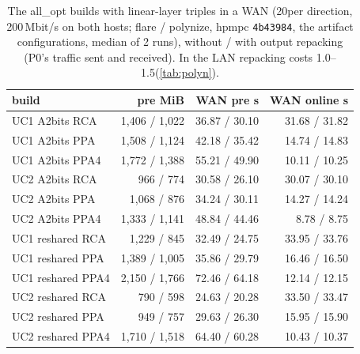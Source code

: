 \begin{table}[t]
\centering\small
\begin{tabular}{@{}lrrr@{}}
\toprule
build & pre MiB & WAN pre s & WAN online s\\
\midrule
UC1 A2bits RCA & 1{,}406 / 1{,}022 & 36.87 / 30.10 & 31.68 / 31.82\\
UC1 A2bits PPA & 1{,}508 / 1{,}124 & 42.18 / 35.42 & 14.74 / 14.83\\
UC1 A2bits PPA4 & 1{,}772 / 1{,}388 & 55.21 / 49.90 & 10.11 / 10.25\\
UC2 A2bits RCA & 966 / 774 & 30.58 / 26.10 & 30.07 / 30.10\\
UC2 A2bits PPA & 1{,}068 / 876 & 34.24 / 30.11 & 14.27 / 14.24\\
UC2 A2bits PPA4 & 1{,}333 / 1{,}141 & 48.84 / 44.46 & 8.78 / 8.75\\
\addlinespace
UC1 reshared RCA & 1{,}229 / 845 & 32.49 / 24.75 & 33.95 / 33.76\\
UC1 reshared PPA & 1{,}389 / 1{,}005 & 35.86 / 29.79 & 16.46 / 16.50\\
UC1 reshared PPA4 & 2{,}150 / 1{,}766 & 72.46 / 64.18 & 12.14 / 12.15\\
UC2 reshared RCA & 790 / 598 & 24.63 / 20.28 & 33.50 / 33.47\\
UC2 reshared PPA & 949 / 757 & 29.63 / 26.30 & 15.95 / 15.90\\
UC2 reshared PPA4 & 1{,}710 / 1{,}518 & 64.40 / 60.28 & 10.43 / 10.37\\
\bottomrule
\end{tabular}
\caption{The all\_opt builds with linear-layer triples in a WAN (20\ms per direction, 200\,Mbit/s on both hosts;
flare / polynize, hpmpc \texttt{4b43984}, the artifact configurations, median of 2 runs), without / with output
repacking (P0's traffic sent and received). In the LAN repacking costs 1.0--1.5\s (\cref{tab:polyn}).}
\label{tab:wan}
\end{table}

